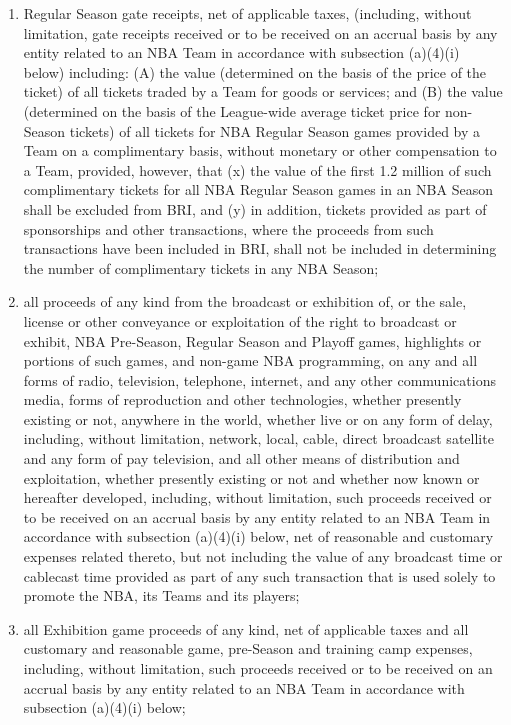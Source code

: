 \documentclass[
]{book}
\providecommand{\tightlist}{%
  \setlength{\itemsep}{0pt}\setlength{\parskip}{0pt}}
\begin{document}
\begin{enumerate}
\begin{enumerate}
    \begin{enumerate}
    \def\labelenumiii{(\roman{enumiii})}
    \tightlist
    \item
      Regular Season gate receipts, net of applicable taxes, (including, without limitation, gate receipts received or to be received on an accrual basis by any entity related to an NBA Team in accordance with subsection (a)(4)(i) below) including: (A) the value (determined on the basis of the price of the ticket) of all tickets traded by a Team for goods or services; and (B) the value (determined on the basis of the League-wide average ticket price for non-Season tickets) of all tickets for NBA Regular Season games provided by a Team on a complimentary basis, without monetary or other compensation to a Team, provided, however, that (x) the value of the first 1.2 million of such complimentary tickets for all NBA Regular Season games in an NBA Season shall be excluded from BRI, and (y) in addition, tickets provided as part of sponsorships and other transactions, where the proceeds from such transactions have been included in BRI, shall not be included in determining the number of complimentary tickets in any NBA Season;
    \item
      all proceeds of any kind from the broadcast or exhibition of, or the sale, license or other conveyance or exploitation of the right to broadcast or exhibit, NBA Pre-Season, Regular Season and Playoff games, highlights or portions of such games, and non-game NBA programming, on any and all forms of radio, television, telephone, internet, and any other communications media, forms of reproduction and other technologies, whether presently existing or not, anywhere in the world, whether live or on any form of delay, including, without limitation, network, local, cable, direct broadcast satellite and any form of pay television, and all other means of distribution and exploitation, whether presently existing or not and whether now known or hereafter developed, including, without limitation, such proceeds received or to be received on an accrual basis by any entity related to an NBA Team in accordance with subsection (a)(4)(i) below, net of reasonable and customary expenses related thereto, but not including the value of any broadcast time or cablecast time provided as part of any such transaction that is used solely to promote the NBA, its Teams and its players;
    \item
      all Exhibition game proceeds of any kind, net of applicable taxes and all customary and reasonable game, pre-Season and training camp expenses, including, without limitation, such proceeds received or to be received on an accrual basis by any entity related to an NBA Team in accordance with subsection (a)(4)(i) below;

\end{enumerate}
\end{enumerate}
\end{enumerate}
\end{document}
